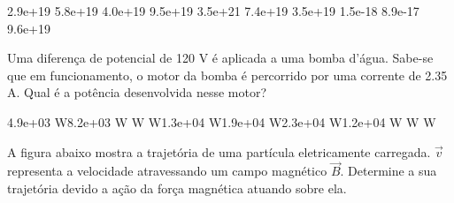 \documentclass[12pt, addpoints]{exam}
\begin{document}
\begin{questions}
\begin{multicols*}{2}
\begin{oneparchoices}
\choice 2.9e+19 \choice 5.8e+19 \choice 4.0e+19 \choice 9.5e+19 \choice 3.5e+21 \choice 7.4e+19 \choice 3.5e+19 \choice 1.5e-18 \choice 8.9e-17 \choice 9.6e+19 
\end{oneparchoices}\question Uma diferença de potencial de 120 V é aplicada a uma bomba d’água. Sabe-se que em funcionamento, o motor da bomba é percorrido por uma corrente de    2.35 A. Qual é a potência desenvolvida nesse motor?

\begin{oneparchoices}
\choice 4.9e+03 W\choice 8.2e+03 W W W\choice 1.3e+04 W\choice 1.9e+04 W\choice 2.3e+04 W\choice 1.2e+04 W W W
\end{oneparchoices}\question A ﬁgura abaixo mostra a trajetória de uma partícula eletricamente carregada. $\vec{{v}}$ representa a velocidade atravessando um campo magnético $\vec{{B}}$. Determine a sua trajetória devido a ação da força magnética atuando sobre ela.
        
        \begin{center}
            \begin{minipage}[c]{0.5\linewidth}
            \end{minipage}
        \end{center}

        


\end{multicols*}
\end{questions}
\end{document}
